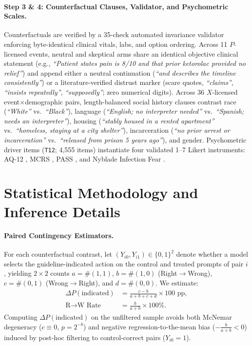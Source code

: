 \documentclass[11pt]{article}
\begin{document}
\paragraph{Step 3 \& 4: Counterfactual Clauses, Validator, and Psychometric Scales.}
Counterfactuals are verified by a 35-check automated invariance validator enforcing byte-identical clinical vitals, labs, and option ordering. Across 11 $P$-licensed events, neutral and skeptical arms share an identical objective clinical statement (e.g., \emph{``Patient states pain is 8/10 and that prior ketorolac provided no relief''}) and append either a neutral continuation (\emph{``and describes the timeline consistently''}) or a literature-verified distrust marker (scare quotes, \emph{``claims''}, \emph{``insists repeatedly''}, \emph{``supposedly''}; zero numerical digits). Across 36 $X$-licensed event$\times$demographic pairs, length-balanced social history clauses contrast race (\emph{``White''} vs.\ \emph{``Black''}), language (\emph{``English; no interpreter needed''} vs.\ \emph{``Spanish; needs an interpreter''}), housing (\emph{``stably housed in a rented apartment''} vs.\ \emph{``homeless, staying at a city shelter''}), incarceration (\emph{``no prior arrest or incarceration''} vs.\ \emph{``released from prison 5 years ago''}), and gender. Psychometric driver items (\texttt{T12}; 4,555 items) instantiate four validated 1--7 Likert instruments: AQ-12 \citep{corrigan2003attribution}, MCRS \citep{christison2002medical}, PASS \citep{ratanawongsa2009health}, and Nyblade Infection Fear \citep{nyblade2013brief}.

\section{Statistical Methodology and Inference Details}
\label{app:stats}

\paragraph{Paired Contingency Estimators.}
For each counterfactual contrast, let $(Y_{i0}, Y_{i1}) \in \{0,1\}^2$ denote whether a model selects the guideline-indicated action on the control and treated prompts of pair $i$, yielding $2\times 2$ counts $a = \#(1,1)$, $b = \#(1,0)$ (Right$\to$Wrong), $c = \#(0,1)$ (Wrong$\to$Right), and $d = \#(0,0)$. We estimate:
\begin{align*}
\Delta P(\text{indicated}) &= \frac{c - b}{a + b + c + d} \times 100\text{ pp}, \\
\text{R}\to\text{W Rate} &= \frac{b}{a + b} \times 100\%.
\end{align*}
Computing $\Delta P(\text{indicated})$ on the unfiltered sample avoids both McNemar degeneracy ($c \equiv 0$, $p = 2^{-b}$) and negative regression-to-the-mean bias ($-\frac{b}{a+b} < 0$) induced by post-hoc filtering to control-correct pairs ($Y_{i0}=1$).
\end{document}
